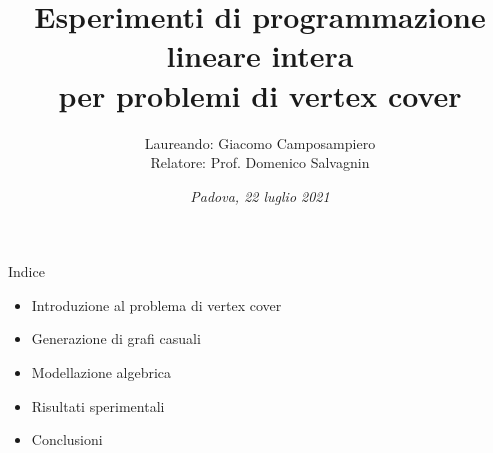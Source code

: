 \documentclass[a4paper]{beamer}
\title[title]{Esperimenti di programmazione lineare intera \\per problemi di vertex cover}
\author[Persone]{Laureando: Giacomo Camposampiero\\Relatore: Prof. Domenico Salvagnin}
\date{\small \textit{Padova, 22 luglio 2021}}
\begin{document}
%
\begin{frame}
	\maketitle
\end{frame}

\begin{frame}{Indice}
	\begin{itemize}
		\item Introduzione al problema di vertex cover
		\vfill
		\item Generazione di grafi casuali
		\vfill
		\item Modellazione algebrica
		\vfill
		\item Risultati sperimentali
		\vfill
		\item Conclusioni
		\vfill
	\end{itemize}
\end{frame}
\end{document}
